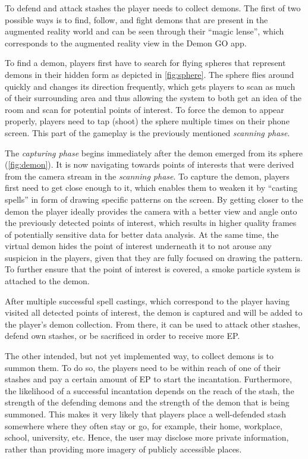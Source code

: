 To defend and attack stashes the player needs to collect demons.
The first of two possible ways is to find, follow, and fight demons that are present in the augmented reality world and can be seen through their \enquote{magic lense}, which corresponds to the augmented reality view in the Demon GO app.

To find a demon, players first have to search for flying spheres that represent demons in their hidden form as depicted in \autoref{fig:sphere}.
The sphere flies around quickly and changes its direction frequently, which gets players to scan as much of their surrounding area and thus allowing the system to both get an idea of the room and scan for potential points of interest.
To force the demon to appear properly, players need to tap (shoot) the sphere multiple times on their phone screen. This part of the gameplay is the previously mentioned \emph{scanning phase}.

The \emph{capturing phase} begins immediately after the demon emerged from its sphere (\autoref{fig:demon}).
It is now navigating towards points of interests that were derived from the camera stream in the \emph{scanning phase}.
To capture the demon, players first need to get close enough to it, which enables them to weaken it by \enquote{casting spells} in form of drawing specific patterns on the screen. 
By getting closer to the demon the player ideally provides the camera with a better view and angle onto the previously detected points of interest, which results in higher quality frames of potentially sensitive data for better data analysis. 
At the same time, the virtual demon hides the point of interest underneath it to not arouse any suspicion in the players, given that they are fully focused on drawing the pattern. To further ensure that the point of interest is covered, a smoke particle system is attached to the demon.

After multiple successful spell castings, which correspond to the player having visited all detected points of interest, the demon is captured and will be added to the player's demon collection. 
From there, it can be used to attack other stashes, defend own stashes, or be sacrificed in order to receive more EP.

The other intended, but not yet implemented way, to collect demons is to summon them.
To do so, the players need to be within reach of one of their stashes and pay a certain amount of EP to start the incantation.
Furthermore, the likelihood of a successful incantation depends on the reach of the stash, the strength of the defending demons and the strength of the demon that is being summoned.
This makes it very likely that players place a well-defended stash somewhere where they often stay or go, for example, their home, workplace, school, university, etc.
Hence, the user may disclose more private information, rather than providing more imagery of publicly accessible places.

